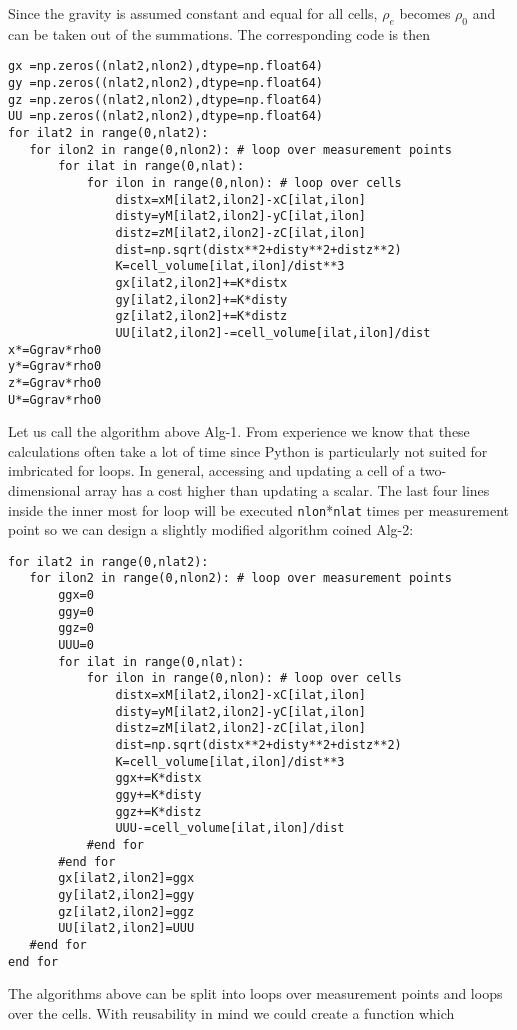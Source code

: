 Since the gravity is assumed constant and equal for all cells, $\rho_e$ becomes $\rho_0$ and can be taken out of the 
summations.
The corresponding code is then 
\begin{lstlisting}
gx =np.zeros((nlat2,nlon2),dtype=np.float64)
gy =np.zeros((nlat2,nlon2),dtype=np.float64)
gz =np.zeros((nlat2,nlon2),dtype=np.float64)
UU =np.zeros((nlat2,nlon2),dtype=np.float64)
for ilat2 in range(0,nlat2):
   for ilon2 in range(0,nlon2): # loop over measurement points
       for ilat in range(0,nlat):
           for ilon in range(0,nlon): # loop over cells
               distx=xM[ilat2,ilon2]-xC[ilat,ilon]
               disty=yM[ilat2,ilon2]-yC[ilat,ilon]
               distz=zM[ilat2,ilon2]-zC[ilat,ilon]
               dist=np.sqrt(distx**2+disty**2+distz**2)
               K=cell_volume[ilat,ilon]/dist**3
               gx[ilat2,ilon2]+=K*distx
               gy[ilat2,ilon2]+=K*disty
               gz[ilat2,ilon2]+=K*distz
               UU[ilat2,ilon2]-=cell_volume[ilat,ilon]/dist
x*=Ggrav*rho0
y*=Ggrav*rho0
z*=Ggrav*rho0
U*=Ggrav*rho0
\end{lstlisting}
Let us call the algorithm above Alg-1.
From experience we know that these calculations often take a lot of time since 
Python is particularly not suited for imbricated for loops. 
In general, accessing and updating a cell of a two-dimensional array has a cost
higher than updating a scalar. The last four lines inside the inner most for loop 
will be executed \lstinline{nlon}*\lstinline{nlat} times per measurement point
so we can design a slightly modified algorithm coined Alg-2:
\begin{lstlisting}
for ilat2 in range(0,nlat2):
   for ilon2 in range(0,nlon2): # loop over measurement points
       ggx=0
       ggy=0
       ggz=0
       UUU=0
       for ilat in range(0,nlat):
           for ilon in range(0,nlon): # loop over cells
               distx=xM[ilat2,ilon2]-xC[ilat,ilon]
               disty=yM[ilat2,ilon2]-yC[ilat,ilon]
               distz=zM[ilat2,ilon2]-zC[ilat,ilon]
               dist=np.sqrt(distx**2+disty**2+distz**2)
               K=cell_volume[ilat,ilon]/dist**3
               ggx+=K*distx
               ggy+=K*disty
               ggz+=K*distz
               UUU-=cell_volume[ilat,ilon]/dist
           #end for
       #end for
       gx[ilat2,ilon2]=ggx
       gy[ilat2,ilon2]=ggy
       gz[ilat2,ilon2]=ggz
       UU[ilat2,ilon2]=UUU
   #end for
end for
\end{lstlisting}
The algorithms above can be split into loops over measurement points 
and loops over the cells. With reusability in mind we could create a function which 
